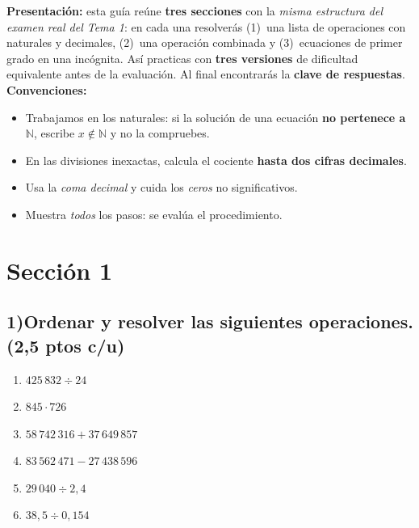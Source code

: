 \documentclass[12pt, letterpaper]{article}
\newcommand{\N}{\mathbb{N}}
\begin{document}


\vspace{4pt}
\begin{cuadroinfo}
  \small
  \textbf{Presentación:} esta guía reúne \textbf{tres secciones} con la \emph{misma estructura del examen real del Tema 1}: en cada una resolverás (1)~una lista de operaciones con naturales y decimales, (2)~una operación combinada y (3)~ecuaciones de primer grado en una incógnita. Así practicas con \textbf{tres versiones} de dificultad equivalente antes de la evaluación. Al final encontrarás la \textbf{clave de respuestas}.
  \\[4pt]
  \textbf{Convenciones:}
  \begin{itemize}[leftmargin=*]
    \item Trabajamos en los naturales: si la solución de una ecuación \textbf{no pertenece a $\N$}, escribe $x \notin \N$ y no la compruebes.
    \item En las divisiones inexactas, calcula el cociente \textbf{hasta dos cifras decimales}.
    \item Usa la \emph{coma decimal} y cuida los \emph{ceros} no significativos.
    \item Muestra \emph{todos} los pasos: se evalúa el procedimiento.
  \end{itemize}
\end{cuadroinfo}

\vspace{8pt}

\section{Sección 1}

\subsection*{1)\quad Ordenar y resolver las siguientes operaciones. \hfill\normalfont\small (2{,}5 ptos c/u)}
\begin{enumerate}[label=\alph*), leftmargin=*]
  \item $425\,832 \div 24$
  \item $845 \cdot 726$
  \item $58\,742\,316 + 37\,649\,857$
  \item $83\,562\,471 - 27\,438\,596$
  \item $29\,040 \div 2{,}4$
  \item $38{,}5 \div 0{,}154$
\end{enumerate}
\end{document}
